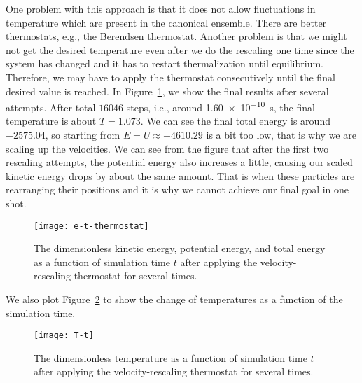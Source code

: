 One problem with this approach is that it does not
allow fluctuations in temperature which are present in the canonical ensemble.
There are better thermostats, e.g., the Berendsen thermostat.
Another problem is that we might not get the desired temperature even after we do the
rescaling one time since the system has changed and it has to restart thermalization
until equilibrium. Therefore, we may have to apply the thermostat consecutively
until the final desired value is reached.
In Figure~\ref{fig:md-thermostat}, we show the final results after several attempts.
After total $16046$ steps, i.e., around \qty{1.60e-10}{\second}, the final temperature is
about $T = 1.073$.
We can see the final total energy is around $-2575.04$, so starting from
$E = U \approx -4610.29$ is a bit too low, that is why we are scaling up the velocities.
We can see from the figure that after the first two rescaling attempts, the potential
energy also increases a little, causing our scaled kinetic energy drops by about the
same amount. That is when these particles are rearranging their positions and
it is why we cannot achieve our final goal in one shot.

\begin{figure}
    \centering
    \texttt{[image: e-t-thermostat]}
    \caption{The dimensionless kinetic energy, potential energy, and total energy
        as a function of simulation time $t$ after applying the velocity-rescaling
        thermostat for several times.}
    \label{fig:md-thermostat}
\end{figure}

We also plot Figure~\ref{fig:T-t} to show the change of temperatures as a function
of the simulation time.

\begin{figure}
    \centering
    \texttt{[image: T-t]}
    \caption{The dimensionless temperature as a function of simulation time $t$ after
        applying the velocity-rescaling thermostat for several times.}
    \label{fig:T-t}
\end{figure}

